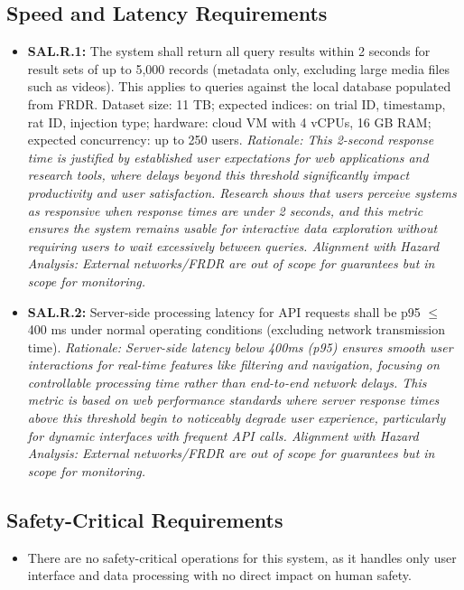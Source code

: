 \documentclass[12pt]{article}
\begin{document}
\subsection{Speed and Latency Requirements}
\begin{itemize}
    \item \textbf{SAL.R.1:}\label{req:sal.r.1} The system shall return all query results within 2 seconds for result sets of up to 5,000 records (metadata only, excluding large media files such as videos). This applies to queries against the local database populated from FRDR. Dataset size: 11 TB; expected indices: on trial ID, timestamp, rat ID, injection type; hardware: cloud VM with 4 vCPUs, 16 GB RAM; expected concurrency: up to 250 users. \textit{Rationale: This 2-second response time is justified by established user expectations for web applications \cite{NielsenWebUsability2000} and research tools, where delays beyond this threshold significantly impact productivity and user satisfaction. Research shows that users perceive systems as responsive when response times are under 2 seconds, and this metric ensures the system remains usable for interactive data exploration without requiring users to wait excessively between queries. Alignment with Hazard Analysis: External networks/FRDR are out of scope for guarantees but in scope for monitoring.}
    \item \textbf{SAL.R.2:}\label{req:sal.r.2} Server-side processing latency for API requests shall be p95 $\leq$ 400 ms under normal operating conditions (excluding network transmission time). \textit{Rationale: Server-side latency below 400ms (p95) ensures smooth user interactions for real-time features like filtering and navigation, focusing on controllable processing time rather than end-to-end network delays. This metric is based on web performance standards \cite{NielsenWebUsability2000} where server response times above this threshold begin to noticeably degrade user experience, particularly for dynamic interfaces with frequent API calls. Alignment with Hazard Analysis: External networks/FRDR are out of scope for guarantees but in scope for monitoring.}
\end{itemize}

\subsection{Safety-Critical Requirements}
\begin{itemize}
    \item There are no safety-critical operations for this system, as it handles only user interface and data processing with no direct impact on human safety.
\end{itemize}
\end{document}
